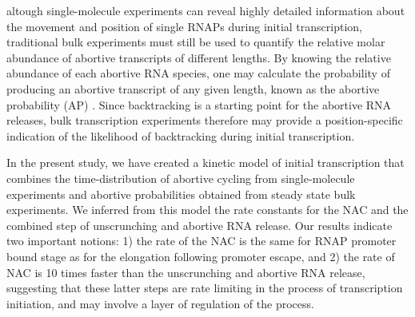 altough single-molecule experiments can reveal highly detailed information about
the movement and position of single RNAPs during initial transcription,
traditional bulk experiments must still be used to quantify the relative molar
abundance of abortive transcripts of different lengths. By knowing the
relative abundance of each abortive RNA species, one may calculate the
probability of producing an abortive transcript of any given length, known as
the abortive probability (AP) \cite{hsu_promoter_2002, hsu_quantitative_1996}.
Since backtracking is a starting point for the abortive RNA releases,
bulk transcription experiments therefore may provide a position-specific indication
of the likelihood of backtracking during initial transcription.

In the present study, we have created a kinetic model of initial transcription
that combines the time-distribution of abortive cycling from single-molecule
experiments and abortive probabilities obtained from steady state bulk
experiments. We inferred from this model the rate constants for the NAC
and the combined step of unscrunching and abortive RNA release. Our results
indicate two important notions: 1) the rate of the NAC is the same for RNAP promoter bound stage as
for the elongation following promoter escape, and 2) the rate of NAC is 10 times faster than the unscrunching and abortive RNA release, suggesting that these latter steps are rate limiting in the process of transcription initiation, and may involve a layer of regulation of the process.  
